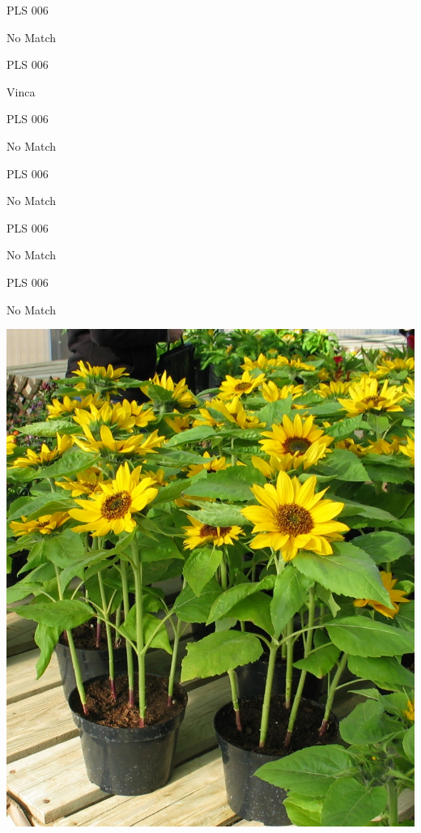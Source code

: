 \documentclass{article}
\begin{document}
\noindent  PLS 006
\vfill
\centerline{{\huge No Match }}
\vfill
\newpage

\noindent  PLS 006
\vfill
\centerline{{\huge Vinca }}
\vfill
\newpage

\noindent  PLS 006
\vfill
\centerline{{\huge No Match }}
\vfill
\newpage

\noindent  PLS 006
\vfill
\centerline{{\huge No Match }}
\vfill
\newpage

\noindent  PLS 006
\vfill
\centerline{{\huge No Match }}
\vfill
\newpage

\noindent  PLS 006
\vfill
\centerline{{\huge No Match }}
\vfill
\newpage

\begin{center}
\includegraphics[height=0.925\paperheight]{../Sunflower_pots.jpg}
\end{center}
\newpage
\end{document}
